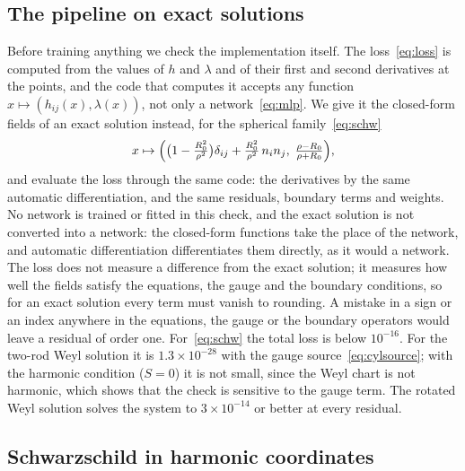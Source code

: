 \documentclass[aps,prd,twocolumn,superscriptaddress, nofootinbib,floatfix]{revtex4-2}
\begin{document}
\subsection{The pipeline on exact solutions}

Before training anything we check the implementation itself.
The loss~\eqref{eq:loss} is computed from the values of $h$ and $\lambda$ and of their first and second derivatives at the points, and the code that computes it accepts any function $x\mapsto(h_{ij}(x),\lambda(x))$, not only a network~\eqref{eq:mlp}.
We give it the closed-form fields of an exact solution instead, for the spherical family~\eqref{eq:schw}
\begin{equation}
  x\mapsto\Bigl(\bigl(1-\tfrac{R_0^2}{\rho^2}\bigr)\delta_{ij}+\tfrac{R_0^2}{\rho^2}\,n_in_j,\;
  \tfrac{\rho-R_0}{\rho+R_0}\Bigr),
\end{equation}
and evaluate the loss through the same code: the derivatives by the same automatic differentiation, and the same residuals, boundary terms and weights.
No network is trained or fitted in this check, and the exact solution is not converted into a network: the closed-form functions take the place of the network, and automatic differentiation differentiates them directly, as it would a network.
The loss does not measure a difference from the exact solution; it measures how well the fields satisfy the equations, the gauge and the boundary conditions, so for an exact solution every term must vanish to rounding.
A mistake in a sign or an index anywhere in the equations, the gauge or the boundary operators would leave a residual of order one.
For~\eqref{eq:schw} the total loss is below $10^{-16}$.
For the two-rod Weyl solution it is $1.3\times10^{-28}$ with the gauge source~\eqref{eq:cylsource}; with the harmonic condition ($S=0$) it is not small, since the Weyl chart is not harmonic, which shows that the check is sensitive to the gauge term.
The rotated Weyl solution solves the system to $3\times10^{-14}$ or better at every residual.

\subsection{Schwarzschild in harmonic coordinates}\label{sec:schw}
\end{document}

